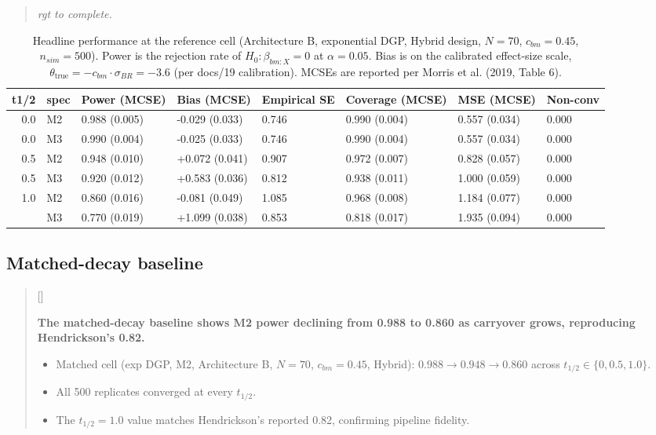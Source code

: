 \documentclass[
  11pt,
]{article}
\newcounter{pgraph}
\newenvironment{bullets}{%
  \stepcounter{pgraph}%
  \begin{quote}\small\sffamily\color[gray]{0.30}%
  {\normalfont\scriptsize\color[gray]{0.58}[\thepgraph]\enspace}}{%
  \end{quote}}
\newenvironment{rgt}{%
  \begin{quote}\small\itshape\color[RGB]{20,60,160}}{%
  \end{quote}}
\begin{document}
\begin{rgt}
rgt to complete.

\end{rgt}

\begin{table}

\caption{\label{tab:headline}Headline performance at the reference cell
    (Architecture B, exponential DGP, Hybrid design, $N = 70$,
    $c_{bm} = 0.45$, $n_{sim} = 500$). Power is the rejection rate of
    $H_0: \beta_{bm:X} = 0$ at $\alpha = 0.05$. Bias is on the
    calibrated effect-size scale,
    $\theta_{\text{true}} = -c_{bm} \cdot \sigma_{BR} = -3.6$
    (per docs/19 calibration). MCSEs are reported per Morris et al.
    (2019, Table 6).}
\centering
\begin{tabular}[t]{rlllllll}
\toprule
t1/2 & spec & Power (MCSE) & Bias (MCSE) & Empirical SE & Coverage (MCSE) & MSE (MCSE) & Non-conv\\
\midrule
0.0 & M2 & 0.988 (0.005) & -0.029 (0.033) & 0.746 & 0.990 (0.004) & 0.557 (0.034) & 0.000\\
0.0 & M3 & 0.990 (0.004) & -0.025 (0.033) & 0.746 & 0.990 (0.004) & 0.557 (0.034) & 0.000\\
0.5 & M2 & 0.948 (0.010) & +0.072 (0.041) & 0.907 & 0.972 (0.007) & 0.828 (0.057) & 0.000\\
0.5 & M3 & 0.920 (0.012) & +0.583 (0.036) & 0.812 & 0.938 (0.011) & 1.000 (0.059) & 0.000\\
1.0 & M2 & 0.860 (0.016) & -0.081 (0.049) & 1.085 & 0.968 (0.008) & 1.184 (0.077) & 0.000\\
\addlinespace
1.0 & M3 & 0.770 (0.019) & +1.099 (0.038) & 0.853 & 0.818 (0.017) & 1.935 (0.094) & 0.000\\
\bottomrule
\end{tabular}
\end{table}

\subsection{Matched-decay baseline}\label{matched-decay-baseline}

\begin{bullets}

\textbf{The matched-decay baseline shows M2 power declining from
0.988 to 0.860 as carryover grows, reproducing Hendrickson's 0.82.}

\begin{itemize}\setlength{\itemsep}{2pt}\setlength{\parskip}{0pt}
\item Matched cell (exp DGP, M2, Architecture B, $N = 70$,
$c_{bm} = 0.45$, Hybrid): $0.988 \to 0.948 \to 0.860$ across
$t_{1/2} \in \{0, 0.5, 1.0\}$.
\item All 500 replicates converged at every $t_{1/2}$.
\item The $t_{1/2} = 1.0$ value matches Hendrickson's reported 0.82,
confirming pipeline fidelity.
\end{itemize}

\end{bullets}
\end{document}
